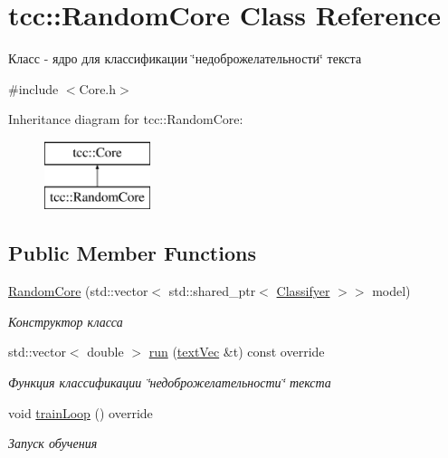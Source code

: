 \hypertarget{classtcc_1_1_random_core}{}\section{tcc\+:\+:Random\+Core Class Reference}
\label{classtcc_1_1_random_core}


Класс -\/ ядро для классификации \char`\"{}недоброжелательности\char`\"{} текста  




{\ttfamily \#include $<$Core.\+h$>$}

Inheritance diagram for tcc\+:\+:Random\+Core\+:\begin{figure}[H]
\begin{center}
\leavevmode
\includegraphics[height=2.000000cm]{classtcc_1_1_random_core}
\end{center}
\end{figure}
\subsection*{Public Member Functions}
\begin{DoxyCompactItemize}
\item 
\hyperlink{classtcc_1_1_random_core_ae18eafe972696d02b7d874b19ddbf07c}{Random\+Core} (std\+::vector$<$ std\+::shared\+\_\+ptr$<$ \hyperlink{classtcc_1_1_classifyer}{Classifyer} $>$$>$ model)
\begin{DoxyCompactList}\small\item\em Конструктор класса \end{DoxyCompactList}\item 
std\+::vector$<$ double $>$ \hyperlink{classtcc_1_1_random_core_a346de33106ad0b7000041ee8880d0011}{run} (\hyperlink{namespacetcc_a9bdf9e81347b7904a6a7f8427d6465dc}{text\+Vec} \&t) const  override
\begin{DoxyCompactList}\small\item\em Функция классификации \char`\"{}недоброжелательности\char`\"{} текста \end{DoxyCompactList}\item 
void \hyperlink{classtcc_1_1_random_core_a38c1691332494325f0b037f0ffb79934}{train\+Loop} () override\hypertarget{classtcc_1_1_random_core_a38c1691332494325f0b037f0ffb79934}{}\label{classtcc_1_1_random_core_a38c1691332494325f0b037f0ffb79934}

\begin{DoxyCompactList}\small\item\em Запуск обучения \end{DoxyCompactList}\end{DoxyCompactItemize}


